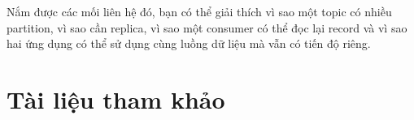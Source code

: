 Nắm được các mối liên hệ đó, bạn có thể giải thích vì sao một topic có nhiều partition, vì sao cần replica, vì sao một consumer có thể đọc lại record và vì sao hai ứng dụng có thể sử dụng cùng luồng dữ liệu mà vẫn có tiến độ riêng.


\FloatBarrier
\clearpage
\section{Tài liệu tham khảo}

\begingroup
\renewcommand{\section}[2]{}
